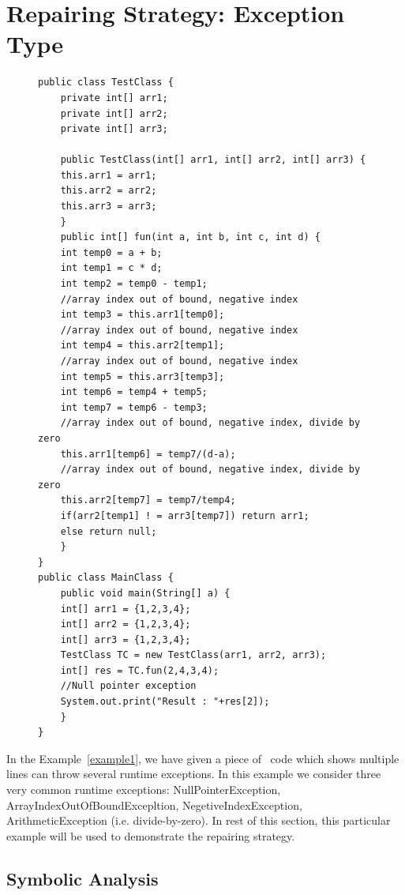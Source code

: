 \section{Repairing Strategy: Exception Type}
\label{sec:strgEx}


\begin{figure}[t]
\lstset{language=Java, caption=Java code which may throws runtime exceptions,
label=example1}
\begin{lstlisting}[countblanklines=false]
public class TestClass {
    private int[] arr1;
    private int[] arr2;
    private int[] arr3;

    public TestClass(int[] arr1, int[] arr2, int[] arr3) {
	this.arr1 = arr1;
	this.arr2 = arr2;
	this.arr3 = arr3;
    }
    public int[] fun(int a, int b, int c, int d) {
	int temp0 = a + b;
	int temp1 = c * d;
	int temp2 = temp0 - temp1;
	//array index out of bound, negative index
	int temp3 = this.arr1[temp0];
	//array index out of bound, negative index
	int temp4 = this.arr2[temp1];
	//array index out of bound, negative index
	int temp5 = this.arr3[temp3];
	int temp6 = temp4 + temp5;
	int temp7 = temp6 - temp3;
	//array index out of bound, negative index, divide by zero
	this.arr1[temp6] = temp7/(d-a);
	//array index out of bound, negative index, divide by zero
	this.arr2[temp7] = temp7/temp4;
	if(arr2[temp1] ! = arr3[temp7]) return arr1;
	else return null;
    }
}
public class MainClass {
    public void main(String[] a) {
	int[] arr1 = {1,2,3,4};
	int[] arr2 = {1,2,3,4};
	int[] arr3 = {1,2,3,4};
	TestClass TC = new TestClass(arr1, arr2, arr3);
	int[] res = TC.fun(2,4,3,4);
	//Null pointer exception
	System.out.print("Result : "+res[2]);
    }    
}
\end{lstlisting}
\end{figure}

In the Example~\ref{example1}, we have given a piece of \java\ code which shows
multiple lines can throw several runtime exceptions.
In this example we consider three very common runtime exceptions:
NullPointerException, ArrayIndexOutOfBoundExcepltion, NegetiveIndexException,
ArithmeticException (i.e. divide-by-zero). In rest of this section, this
particular example will be used to demonstrate the repairing strategy.

\subsection{Symbolic Analysis}
\label{subsec:symb}

